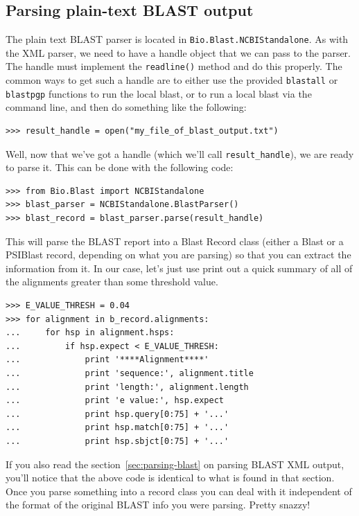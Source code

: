 \documentclass{report}
\begin{document}
\subsection{Parsing plain-text BLAST output}

The plain text BLAST parser is located in \verb|Bio.Blast.NCBIStandalone|.
As with the XML parser, we need to have a handle object that we can pass to the parser. The handle must implement the \verb|readline()| method and do this properly. The common ways to get such a handle are to either use the provided \verb|blastall| or \verb|blastpgp| functions to run the local blast, or to run a local blast via the command line, and then do something like the following:

\begin{verbatim}
>>> result_handle = open("my_file_of_blast_output.txt")
\end{verbatim}

Well, now that we've got a handle (which we'll call \verb|result_handle|),
we are ready to parse it. This can be done with the following code:

\begin{verbatim}
>>> from Bio.Blast import NCBIStandalone
>>> blast_parser = NCBIStandalone.BlastParser()
>>> blast_record = blast_parser.parse(result_handle)
\end{verbatim} 

This will parse the BLAST report into a Blast Record class (either a Blast or a PSIBlast record, depending on what you are parsing) so that you can extract the information from it. In our case, let's just use print out a quick summary of all of the alignments greater than some threshold value.

\begin{verbatim}
>>> E_VALUE_THRESH = 0.04
>>> for alignment in b_record.alignments:
...     for hsp in alignment.hsps:
...         if hsp.expect < E_VALUE_THRESH:
...             print '****Alignment****'
...             print 'sequence:', alignment.title
...             print 'length:', alignment.length
...             print 'e value:', hsp.expect
...             print hsp.query[0:75] + '...'
...             print hsp.match[0:75] + '...'
...             print hsp.sbjct[0:75] + '...'
\end{verbatim}

If you also read the section~\ref{sec:parsing-blast} on parsing BLAST XML output, you'll notice that the above code is identical to what is found in that section. Once you parse something into a record class you can deal with it independent of the format of the original BLAST info you were parsing. Pretty snazzy!
\end{document}
